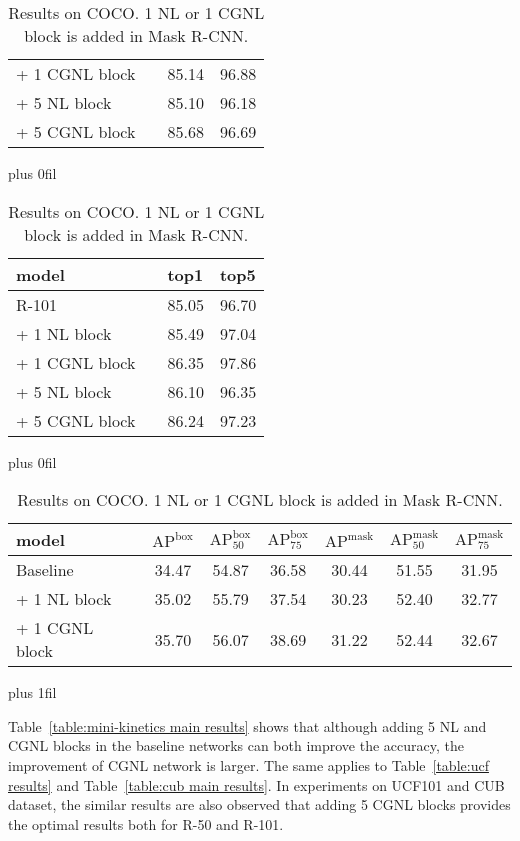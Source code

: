 \documentclass{article}
\begin{document}
\begin{table}[t]
\begin{minipage}[t]{0.67\textwidth}
\begin{subtable}[t]{1.0\textwidth}
\begin{tabularx}{.48\textwidth}{llll}
  + 1 CGNL block        && 85.14     & 96.88   \\
  \cmidrule(r){2-4}
  + 5 NL block          && 85.10     & 96.18   \\
  + 5 CGNL block        && 85.68     & 96.69   \\
  \bottomrule
\end{tabularx}
% 
\hskip 8pt plus 0fil
% 
\begin{tabularx}{.48\textwidth}{llll}
  \toprule
  model                 && top1      & top5    \\
  \midrule
  R-101                 && 85.05     & 96.70   \\
  \cmidrule(r){2-4}
  + 1 NL block          && 85.49     & 97.04   \\
  + 1 CGNL block        && 86.35     & 97.86   \\
  \cmidrule(r){2-4}
  + 5 NL block          && 86.10     & 96.35   \\
  + 5 CGNL block        && 86.24     & 97.23   \\
  \bottomrule
\end{tabularx}
\end{subtable}
%
%
\vskip 1.5pt plus 0fil
% 
\begin{subtable}[t]{1.0\textwidth}
\caption{\small{
  Results on COCO.
  1 NL or 1 CGNL block is added in Mask R-CNN.
  }}
\label{table:mask rcnn}
\scriptsize
\centering
\begin{tabularx}{\textwidth}{llccc|ccc}
  \toprule
  model && $\text{AP}^{\text{box}}$ & $\text{AP}_{\text{50}}^{\text{box}}$ & $\text{AP}_{\text{75}}^{\text{box}}$ & $\text{AP}^{\text{mask}}$ & $\text{AP}_{\text{50}}^{\text{mask}}$ & $\text{AP}_{\text{75}}^{\text{mask}}$ \\
  \midrule
  Baseline             && 34.47 & 54.87 & 36.58 & 30.44 & 51.55 & 31.95 \\
  \cmidrule(r){2-8}
  + 1 NL block         && 35.02 & 55.79 & 37.54 & 30.23 & 52.40 & 32.77 \\
  + 1 CGNL block       && 35.70 & 56.07 & 38.69 & 31.22 & 52.44 & 32.67 \\
  \bottomrule
\end{tabularx}
\end{subtable}
%
%
\end{minipage}\hskip 0pt plus 1fil
%
%
\end{table}
Table~\ref{table:mini-kinetics main results} shows that although adding 5 NL and CGNL blocks in the baseline networks can both improve the accuracy, the improvement of CGNL network is larger.
The same applies to Table~\ref{table:ucf results} and Table~\ref{table:cub main results}.
In experiments on UCF101 and CUB dataset, the similar results are also observed that adding 5 CGNL blocks provides the optimal results both for R-50 and R-101.
\end{document}

